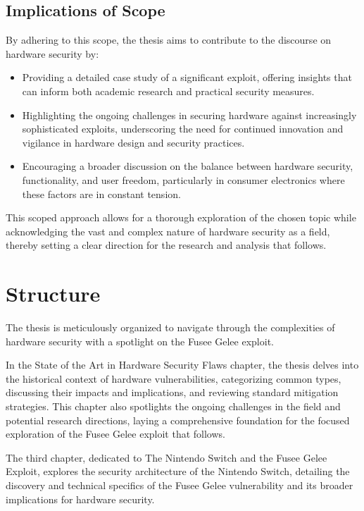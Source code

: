 \hypertarget{implications-of-scope}{%
\subsection{Implications of Scope}\label{implications-of-scope}}

By adhering to this scope, the thesis aims to contribute to the
discourse on hardware security by:

\begin{itemize}
\item
  Providing a detailed case study of a significant exploit, offering
  insights that can inform both academic research and practical security
  measures.
\item
  Highlighting the ongoing challenges in securing hardware against
  increasingly sophisticated exploits, underscoring the need for
  continued innovation and vigilance in hardware design and security
  practices.
\item
  Encouraging a broader discussion on the balance between hardware
  security, functionality, and user freedom, particularly in consumer
  electronics where these factors are in constant tension.
\end{itemize}

This scoped approach allows for a thorough exploration of the chosen
topic while acknowledging the vast and complex nature of hardware
security as a field, thereby setting a clear direction for the research
and analysis that follows.

\hypertarget{structure}{%
\section{Structure}\label{structure}}

The thesis is meticulously organized to navigate through the
complexities of hardware security with a spotlight on the Fusee Gelee
exploit.

In the State of the Art in Hardware Security Flaws chapter, the thesis
delves into the historical context of hardware vulnerabilities,
categorizing common types, discussing their impacts and implications,
and reviewing standard mitigation strategies. This chapter also
spotlights the ongoing challenges in the field and potential research
directions, laying a comprehensive foundation for the focused
exploration of the Fusee Gelee exploit that follows.

The third chapter, dedicated to The Nintendo Switch and the Fusee Gelee
Exploit, explores the security architecture of the Nintendo Switch,
detailing the discovery and technical specifics of the Fusee Gelee
vulnerability and its broader implications for hardware security.

